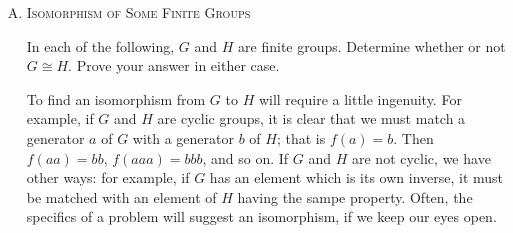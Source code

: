 \documentclass[twoside]{amsart}
\newcommand{\solution}{\textsc{Solution}\xspace}
\newcommand{\iso}{\cong}
\newcommand{\blank}{\vspace{5pt}}
\begin{document}
\begin{enumerate}[A.]
\begin{enumerate}[(i)]
\begin{enumerate}[1.]
         \item Prove the for each element $a$ in $G_1$, $f(a^{-1})
         = [f(a)]^{-1}$. (\textsc{Hint}: You may use Theorem 2 of 
         Chapter 4.)

         \setcounter{equation}{0}
         \blank \noindent \solution 
         \begin{align}
            f(aa^{-1}) &= f(e)          && \text{Inverses} \\
            f(aa^{-1}) &= f(a)f(a^{-1}) && \text{Isomorphism} \\
            f(e)       &= f(a)f(a^{-1}) && \text{(2) and (3)} \\
            f(a^{-1})  &= [f(a)]^{-1}   && \text{Theorem 2 of Chap 4 (3)}
         \end{align}

         \item If $G_1$ is a cyclic group with generator $a$, prove
         that $G_2$ is also a cyclic group, with generator $f(a)$.

         \blank \noindent \solution Choose any element $y \in G_2$. 
         Let $x = f^{-1}(y)$. We know that $x = a^n$ for some value of $n$.
         If $n=0$ then we have $y = f(e_1) = e_2 = [f(a)]^0$.
         If $n>0$ then $y = f(a^n) = \underbrace{f(a)f(a)\cdots f(a)}_{n
         \text{ times}} = [f(a)]^n$. Finally, if $n<0$ then
         $y = f(a^n) = \underbrace{f(a^{-1})f(a^{-1})\cdots f(a^{-1})}_{-n
         \text{ times}} = [f(a^{-1})]^{-n}$. From part 2 we know that
         $f(a^{-1}) = [f(a)]^{-1}$. Therefore 
         $[f(a^{-1})]^{-n} = ([f(a)]^{-1})^{-n}$. For each value of
         $n$ we have shown how to generate $y$ from $f(a)$. And since,
         $y$ was an arbitrary element of $G_2$ this means any element
         of $G_2$ can be generated from $f(a)$. Therefore,
         $G_2$ is a cyclic group with generator $f(a)$.

      \end{enumerate}

   \end{enumerate}

   \blank
   \item \textsc{Isomorphism of Some Finite Groups}

   In each of the following, $G$ and $H$ are finite groups. Determine whether 
   or not $G \iso H$. Prove your answer in either case.

   To find an isomorphism from $G$ to $H$ will require a little 
   ingenuity. For example, if $G$ and $H$ are cyclic groups, it is clear
   that we must match a generator $a$ of $G$ with a generator $b$ of
   $H$; that is $f(a)=b$. Then $f(aa)=bb$, $f(aaa)=bbb$, and so on. If
   $G$ and $H$ are not cyclic, we have other ways: for example, if 
   $G$ has an element which is its own inverse, it must be matched with
   an element of $H$ having the sampe property. Often, the specifics of a
   problem will suggest an isomorphism, if we keep our eyes open.


\end{enumerate}
\end{document}
